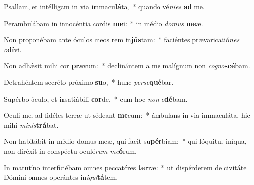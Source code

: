 \item Psallam, et intélligam in via immacu\textbf{lá}ta,~* quando vé\textit{ni}\textit{es} \textbf{ad} me.
\item Perambulábam in innocéntia cordis \textbf{me}i:~* in médio \textit{do}\textit{mus} \textbf{me}æ.
\item Non proponébam ante óculos meos rem in\textbf{jús}tam:~* faciéntes prævaricatió\textit{nes} \textit{o}\textbf{dí}vi.
\item Non adhǽsit mihi cor \textbf{pra}vum:~* declinántem a me malígnum non \textit{co}\textit{gno}\textbf{scé}bam.
\item Detrahéntem secréto próximo \textbf{su}o,~* hunc \textit{per}\textit{se}\textbf{qué}bar.
\item Supérbo óculo, et insatiábili \textbf{cor}de,~* cum hoc \textit{non} \textit{e}\textbf{dé}bam.
\item Oculi mei ad fidéles terræ ut sédeant \textbf{me}cum:~* ámbulans in via immaculáta, hic mihi \textit{mi}\textit{nis}\textbf{trá}bat.
\item Non habitábit in médio domus meæ, qui facit su\textbf{pér}biam:~* qui lóquitur iníqua, non diréxit in conspéctu oculó\textit{rum} \textit{me}\textbf{ó}rum.
\item In matutíno interficiébam omnes peccatóres \textbf{ter}ræ:~* ut dispérderem de civitáte Dómini omnes operántes in\textit{i}\textit{qui}\textbf{tá}tem.
